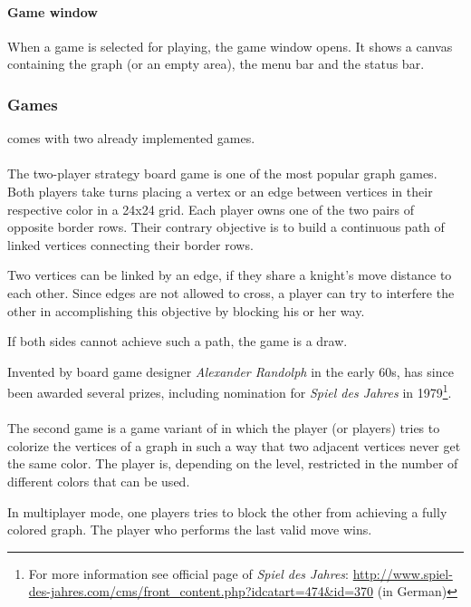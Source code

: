 \paragraph*{Game window}
When a game is selected for playing, the game window opens. It shows a canvas containing the graph (or an empty area), the menu bar and the status bar.\par

\subsubsection{Games}
{\graphioli} comes with two already implemented games.\par
\paragraph*{\twixt}
The two-player strategy board game {\twixt} is one of the most popular graph games. Both players take turns placing a vertex or an edge between vertices in their respective color in a 24x24 grid. Each player owns one of the two pairs of opposite border rows. Their contrary objective is to build a continuous \gls{path} of linked vertices connecting their border rows.\par
Two vertices can be linked by an edge, if they share a knight's move distance to each other. Since edges are not allowed to cross, a player can try to interfere the other in accomplishing this objective by blocking his or her way.\par
If both sides cannot achieve such a path, the game is a draw.\par
Invented by board game designer \emph{Alexander Randolph} in the early 60s, {\twixt} has since been awarded several prizes, including nomination for \emph{Spiel des Jahres} in 1979\footnote{For more information see official page of \emph{Spiel des Jahres}: \url{http://www.spiel-des-jahres.com/cms/front_content.php?idcatart=474&id=370} (in German)}.\par
\paragraph*{\graphcoloring}
The second game is a game variant of {\graphcoloring} in which the player (or players) tries to colorize the vertices of a graph in such a way that two \gls{adjacent} vertices never get the same color. The player is, depending on the level, restricted in the number of different colors that can be used.\par
In multiplayer mode, one players tries to block the other from achieving a fully colored graph. The player who performs the last valid move wins.\par